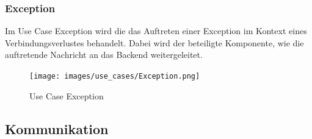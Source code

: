 \newpage
\subsubsection{Exception}

Im Use Case Exception wird die das Auftreten einer Exception im Kontext eines Verbindungsverlustes behandelt. Dabei wird der beteiligte Komponente, wie die auftretende Nachricht an das Backend weitergeleitet. 

\begin{figure}[h]
	\begin{center}
		\texttt{[image: images/use\_cases/Exception.png]}
	\end{center}
	\caption{Use Case Exception}
	\label{fig:Exception}
\end{figure}

\newpage
\subsection{Kommunikation}